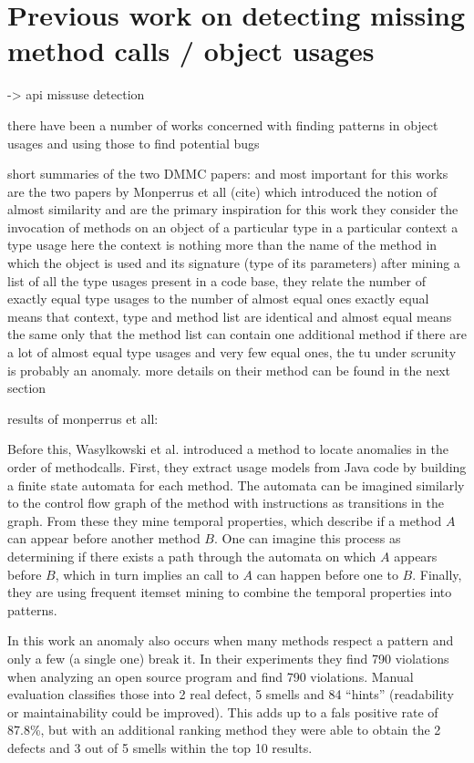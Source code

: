 \section{Previous work on detecting missing method calls / object usages}
-> api missuse detection

there have been a number of works concerned with finding patterns in object usages and using those to find potential bugs

short summaries of the two DMMC papers: \cite{monperrus2010detecting} and \cite{monperrus2013detecting}
most important for this works are the two papers by Monperrus et all (cite)
which introduced the notion of almost similarity and are the primary inspiration for this work
they consider the invocation of methods on an object of a particular type in a particular context a type usage
here the context is nothing more than the name of the method in which the object is used and its signature (type of its parameters)
after mining a list of all the type usages present in a code base, they relate the number of exactly equal type usages to the number of almost equal ones
exactly equal means that context, type and method list are identical and almost equal means the same only that the method list can contain one additional method
if there are a lot of almost equal type usages and very few equal ones, the tu under scrunity is probably an anomaly.
more details on their method can be found in the next section

results of monperrus et all:

Before this, Wasylkowski et al. \cite{wasylkowski2007detecting} introduced a method to locate anomalies in the order of methodcalls.
First, they extract usage models from Java code by building a finite state automata for each method.
The automata can be imagined similarly to the control flow graph of the method with instructions as transitions in the graph.
From these they mine temporal properties, which describe if a method $A$ can appear before another method $B$.
One can imagine this process as determining if there exists a path through the automata on which $A$ appears before $B$, which in turn implies an call to $A$ can happen before one to $B$.
Finally, they are using frequent itemset mining \cite{han2006data} to combine the temporal properties into patterns.

In this work an anomaly also occurs when many methods respect a pattern and only a few (a single one) break it.
In their experiments they find 790 violations when analyzing an open source program and find 790 violations.
Manual evaluation classifies those into 2 real defect, 5 smells and 84 ``hints'' (readability or maintainability could be improved).
This adds up to a fals positive rate of 87.8\%, but with an additional ranking method they were able to obtain the 2 defects and 3 out of 5 smells within the top 10 results.

